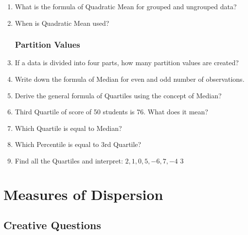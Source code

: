 \documentclass[a4paper,oneside]{book}
\begin{document}
\begin{enumerate}
    \item What is the formula of Quadratic Mean for grouped and ungrouped data?
    \item When is Quadratic Mean used?

\subsection{Partition Values}
    \item If a data is divided into four parts, how many partition values are created?
    \item Write down the formula of Median for even and odd number of observations.
    \item Derive the general formula of Quartiles using the concept of Median?
    \item Third Quartile of score of 50 students is 76. What does it mean?
    \item Which Quartile is equal to Median?
    \item Which Percentile is equal to 3rd Quartile?
    \item Find all the Quartiles and interpret: $2,1,0,5,-6,7,-4$ \hfill 3

    
\end{enumerate}

\chapter{Measures of Dispersion} 
\section{Creative Questions}
\end{document}
